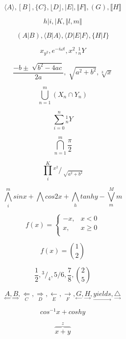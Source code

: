 \documentclass{book}
\begin{document}
$$\langle A\rangle , [B], \lbrace C\rbrace , \lfloor D\rfloor , \vert E\vert , \Vert F\Vert , (G), \llbracket H\rrbracket $$

$$h\vert i, \vert K, \Vert l, m\Vert $$

$$(A\vert B),\langle B\vert A\rangle ,\langle D\vert E\vert F\rangle , \lbrace H\vert I\rbrace $$

$${x}_{{y}^{2}}, {e}^{-i\omega t},{x}^{2},{^1_n}Y$$

$$\frac{-b\pm \sqrt[]{{b}^{2}-4ac}}{2a}, \sqrt[]{{a}^{2}+{b}^{2}}, \sqrt[3]{x}$$

$$\bigcup _{n=1}^{m} ({X}_{n}\cap {Y}_{n})$$

$$\sum _{i=0}^{n} {^1_n}Y$$

$$\bigcap _{n=1}^{m} \frac{\pi }{2}$$

$$\prod _{i}^{K} {^{{x}^{2}}}/_{\sqrt[]{{a}^{2}+{b}^{2}}}$$

$$\bigwedge_{i}^{m} sinx+\bigwedge_{}^{} cos2x+\bigwedge_{h}^{} tanhy-\bigvee_{m}^{M} m$$

$$f(x)=\left \{ \begin{array}{lr}
-x,  & x<0 \\
x,  & x\geq 0 \\
\end{array} \right.$$

$$f(x)={1 \choose 2}$$

$$\frac{1}{2}, {^{3}}/_{4}, {5}/{6},\frac{7}{8}, {2 \choose 5}$$

$$\underset{\Leftarrow }{A}, \underset{\Rightarrow }{B}, \underset{C}{\Leftarrow }, \underset{D}{\Rightarrow }, \underset{E}{\leftarrow }, \underset{F}{\rightarrow },\underset{\leftarrow }{G}, \underset{\rightarrow }{H}, \underset{\rightarrow }{yields}, \underset{\rightarrow }{\triangle}$$

$${cos}^{-1}x+coshy$$

$$\overset{z}{\overbrace{x+y}}$$
\end{document}
